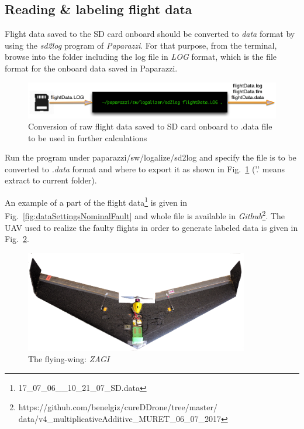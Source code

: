 \subsection{Reading \& labeling flight data}


Flight data saved to the SD card onboard should be converted to \emph{data} format by using the \textit{sd2log} program of \emph{Paparazzi}. For that purpose, from the terminal, browse into the folder including the log file in \emph{LOG} format, which is the file format for the onboard data saved in Paparazzi. 

\begin{figure}[h]
\begin{center}
\includegraphics[width=15cm]{figures/dataManip}    %
\caption{Conversion of raw flight data saved to SD card onboard to .data file to be used in further calculations} 
\label{fig:dataManip}
\end{center}
\end{figure}

Run the program under paparazzi/sw/logalize/sd2log and specify the file is to be converted to \emph{.data} format and where to export it as shown in Fig.~\ref{fig:dataManip} ('.' means extract to current folder). 

An example of a part of the flight data\footnote{17\_07\_06\_\_10\_21\_07\_SD.data} is given in Fig.~\ref{fig:dataSettingsNominalFault} and whole file is available in \emph{Github}\footnote{https://github.com/benelgiz/cureDDrone/tree/master/ \\ data/v4\_multiplicativeAdditive\_MURET\_06\_07\_2017}. 
The UAV used to realize the faulty flights in order to generate labeled data is given in Fig.~\ref{fig:zagi}. 

\begin{figure}[h]
\begin{center}
\includegraphics[width=0.87\textwidth]{figures/zagi}    %
\caption{The flying-wing: \emph{ZAGI}} 
\label{fig:zagi}
\end{center}
\end{figure}

